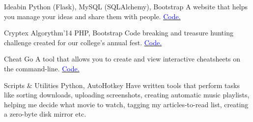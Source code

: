     {Ideabin}
    {}
    {\scriptsize Python (Flask), MySQL (SQLAlchemy), Bootstrap}
    {}
    {
        A website that helps you manage your ideas and share them with people.
        \hfill
        \href{http://github.com/ideabin/ideabin/}{\textcolor{blue}{\scriptsize Code.}}
    }
    \vspace*{0.2\baselineskip}

    {Cryptex}
    {Algorythm'14}
    {\scriptsize PHP, Bootstrap}
    {}
    {
        Code breaking and treasure hunting challenge created for our college's annual fest.
        \hfill
        \href{http://github.com/jdevlabs/cryptex/}{\textcolor{blue}{\scriptsize Code.}}
    }
    \vspace*{0.2\baselineskip}

\cventry{}
    {Cheat}
    {}
    {\scriptsize Go}
    {}
    {
        A tool that allows you to create and view interactive cheatsheets on the command-line.
        \hfill
        \href{http://github.com/dufferzafar/cheat/}{\textcolor{blue}{\scriptsize Code.}}
    }
    \vspace*{0.2\baselineskip}

\cventry{}
    {Scripts \& Utilities}
    {}
    {\scriptsize Python, AutoHotkey}
    {}
    {
        Have written tools that perform tasks like
        sorting downloads,
        uploading screenshots,
        creating automatic music playlists,
        helping me decide what movie to watch,
        tagging my articles-to-read list,
        creating a zero-byte disk mirror etc.
    }
    \vspace*{0.2\baselineskip}
